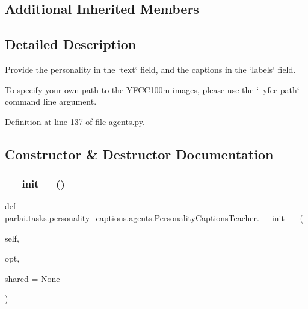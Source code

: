 \subsection*{Additional Inherited Members}


\subsection{Detailed Description}
\begin{DoxyVerb}Provide the personality in the `text` field, and the captions in the `labels` field.

To specify your own path to the YFCC100m images, please use the `--yfcc-path`
command line argument.
\end{DoxyVerb}
 

Definition at line 137 of file agents.\+py.



\subsection{Constructor \& Destructor Documentation}
\mbox{\label{classparlai_1_1tasks_1_1personality__captions_1_1agents_1_1PersonalityCaptionsTeacher_a629424710e209cb59e97404a313a97a8}} 
\subsubsection{\texorpdfstring{\+\_\+\+\_\+init\+\_\+\+\_\+()}{\_\_init\_\_()}}
{\footnotesize\ttfamily def parlai.\+tasks.\+personality\+\_\+captions.\+agents.\+Personality\+Captions\+Teacher.\+\_\+\+\_\+init\+\_\+\+\_\+ (\begin{DoxyParamCaption}\item[{}]{self,  }\item[{}]{opt,  }\item[{}]{shared = {\ttfamily None} }\end{DoxyParamCaption})}



